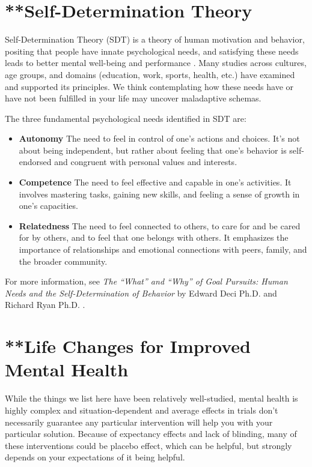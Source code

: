 \documentclass[12pt,letterpaper]{book}
\begin{document}
\chapter{**Self-Determination Theory}
\label{sec:sdt}
Self-Determination Theory (SDT) is a theory of human motivation and behavior, positing that people have innate psychological needs, and satisfying these needs leads to better mental well-being and performance \cite{deciSDT}. Many studies across cultures, age groups, and domains (education, work, sports, health, etc.) have examined and supported its principles. We think contemplating how these needs have or have not been fulfilled in your life may uncover maladaptive schemas.

The three fundamental psychological needs identified in SDT are:
\begin{itemize}
    \item \textbf{Autonomy} The need to feel in control of one's actions and choices. It's not about being independent, but rather about feeling that one's behavior is self-endorsed and congruent with personal values and interests.
    \item \textbf{Competence} The need to feel effective and capable in one's activities. It involves mastering tasks, gaining new skills, and feeling a sense of growth in one's capacities.
    \item \textbf{Relatedness} The need to feel connected to others, to care for and be cared for by others, and to feel that one belongs with others. It emphasizes the importance of relationships and emotional connections with peers, family, and the broader community.
\end{itemize}
For more information, see \textit{The “What” and “Why” of Goal Pursuits: Human Needs and the Self-Determination of Behavior} by Edward Deci Ph.D. and Richard Ryan Ph.D. \cite{deciSDT}.
\chapter{**Life Changes for Improved Mental Health}
\label{sec:lifechanges}
While the things we list here have been relatively well-studied, mental health is highly complex and situation-dependent and average effects in trials don't necessarily guarantee any particular intervention will help you with your particular solution. Because of expectancy effects and lack of blinding, many of these interventions could be placebo effect, which can be helpful, but strongly depends on your expectations of it being helpful.
\end{document}
